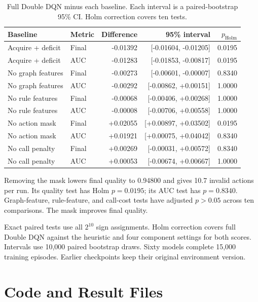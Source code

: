\begin{table}[t]
\centering
\caption{Full Double DQN minus each baseline. Each interval is a paired-bootstrap 95\% CI. Holm correction covers ten tests.}
\label{tab:offline_tests}
\footnotesize
\setlength{\tabcolsep}{3pt}
\begin{tabular*}{\textwidth}{@{\extracolsep{\fill}}llrrr@{}}
\toprule
Baseline & Metric & Difference & 95\% interval & $p_{\mathrm{Holm}}$ \\
\midrule
Acquire + deficit & Final & -0.01392 & [-0.01604, -0.01205] & 0.0195 \\
Acquire + deficit & AUC & -0.01283 & [-0.01853, -0.00817] & 0.0195 \\
No graph features & Final & -0.00273 & [-0.00601, -0.00007] & 0.8340 \\
No graph features & AUC & -0.00292 & [-0.00862, +0.00151] & 1.0000 \\
No rule features & Final & -0.00068 & [-0.00406, +0.00268] & 1.0000 \\
No rule features & AUC & -0.00008 & [-0.00706, +0.00558] & 1.0000 \\
No action mask & Final & +0.02055 & [+0.00897, +0.03502] & 0.0195 \\
No action mask & AUC & +0.01921 & [+0.00075, +0.04042] & 0.8340 \\
No call penalty & Final & +0.00269 & [-0.00031, +0.00572] & 0.8340 \\
No call penalty & AUC & +0.00053 & [-0.00674, +0.00667] & 1.0000 \\
\bottomrule
\end{tabular*}
\end{table}


Removing the mask lowers final quality to 0.94800 and gives 10.7 invalid
actions per run. Its quality test has Holm $p=0.0195$; its AUC test has
$p=0.8340$. Graph-feature, rule-feature, and call-cost tests have adjusted
$p>0.05$ across ten comparisons. The mask improves final quality.

Exact paired tests use all $2^{10}$ sign assignments. Holm correction
covers full Double DQN against the heuristic and four component settings
for both scores. Intervals use 10,000 paired bootstrap draws.
Sixty models complete 15,000 training episodes. Earlier checkpoints
keep their original environment version.

\section{Code and Result Files}

